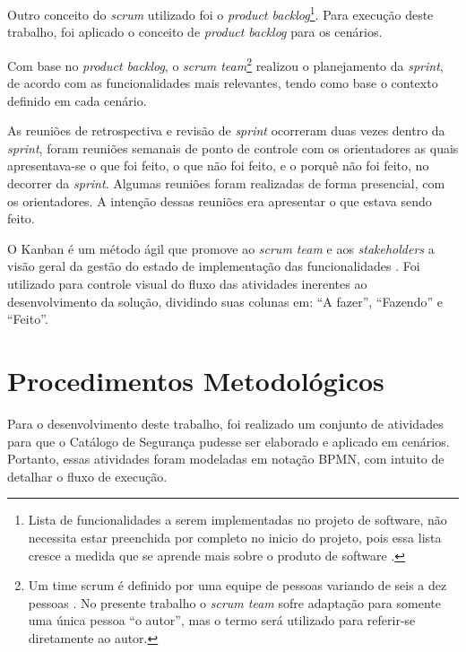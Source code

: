 Outro conceito do \textit{scrum} utilizado foi o \textit{product backlog}\footnote[2]{Lista de funcionalidades a serem implementadas no projeto de software, não necessita estar preenchida por completo no inicio do projeto, pois essa lista cresce a medida que se aprende mais sobre o produto de software \cite{schwaber2002agile}.}. Para execução deste trabalho, foi aplicado o conceito de \textit{product backlog} para os cenários.

Com base no \textit{product backlog}, o \textit{scrum team}\footnote[3]{Um time scrum é definido por uma equipe de pessoas variando de seis a dez pessoas \cite{schwaber2002agile}. No presente trabalho o \textit{scrum team} sofre adaptação para somente uma única pessoa “o autor”, mas o termo será utilizado para referir-se diretamente ao autor.} realizou o planejamento da \textit{sprint}, de acordo com as funcionalidades mais relevantes, tendo como base o contexto definido em cada cenário. 

As reuniões de retrospectiva e revisão de \textit{sprint} ocorreram duas vezes dentro da \textit{sprint}, foram reuniões semanais de ponto de controle com os orientadores as quais apresentava-se o que foi feito, o que não foi feito, e o porquê não foi feito, no decorrer da \textit{sprint}. Algumas reuniões foram realizadas de forma presencial, com os orientadores. A intenção dessas reuniões era apresentar o que estava sendo feito.

O Kanban é um método ágil que promove ao \textit{scrum team} e aos \textit{stakeholders} a visão geral da gestão do estado de implementação das funcionalidades \cite{prikladnicki2014metodos}. Foi utilizado para controle visual do fluxo das atividades inerentes ao desenvolvimento da solução, dividindo suas colunas em:  “A fazer”, “Fazendo” e “Feito”.

\pagebreak

\section{Procedimentos Metodológicos}
\label{sec:procedimentosMetodológicos}

Para o desenvolvimento deste trabalho, foi realizado um conjunto de atividades para que o Catálogo de Segurança pudesse ser elaborado e aplicado em cenários. Portanto, essas atividades foram modeladas em notação BPMN, com intuito de detalhar o fluxo de execução.

